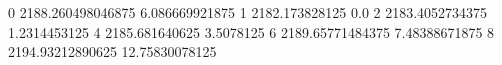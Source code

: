 0 2188.260498046875 6.086669921875
1 2182.173828125 0.0
2 2183.4052734375 1.2314453125
4 2185.681640625 3.5078125
6 2189.65771484375 7.48388671875
8 2194.93212890625 12.75830078125
